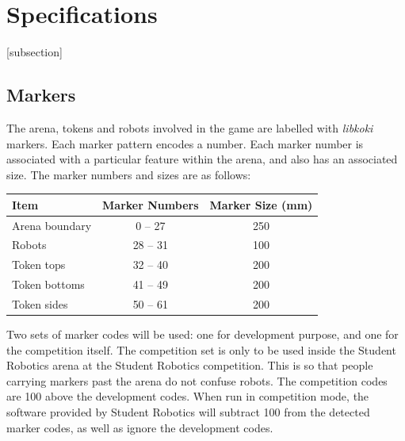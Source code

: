 \section{Specifications}
\label{sec:Specifications}

[subsection]
\newcommand{\rcnii}{\stepcounter{rulei}\arabic{section}.\arabic{subsection}.\arabic{rulei}}
\renewcommand{\labelenumi}{\rcnii}

\subsection{Markers}
\label{sub:markers}
The arena, tokens and robots involved in the game are labelled with \textit{libkoki} markers.
Each marker pattern encodes a number.
Each marker number is associated with a particular feature within the arena, and also has an associated size.
The marker numbers and sizes are as follows:

\begin{center}
  \begin{tabular}{lcc}
    \toprule
    \textbf{Item} & \textbf{Marker Numbers} & \textbf{Marker Size (mm)} \\
    \midrule
    Arena boundary & {} 0 -- 27 & 250 \\
    Robots & 28 -- 31 & 100 \\
    Token tops & 32 -- 40 & 200 \\
    Token bottoms & 41 -- 49 & 200 \\
    Token sides & 50 -- 61 & 200 \\
    \bottomrule
  \end{tabular}
\end{center}


Two sets of marker codes will be used: one for development purpose, and one for the competition itself.
The competition set is only to be used inside the Student Robotics arena at the Student Robotics competition.
This is so that people carrying markers past the arena do not confuse robots.
The competition codes are 100 above the development codes.
When run in competition mode, the software provided by Student Robotics will subtract 100 from the detected marker codes, as well as ignore the development codes.

